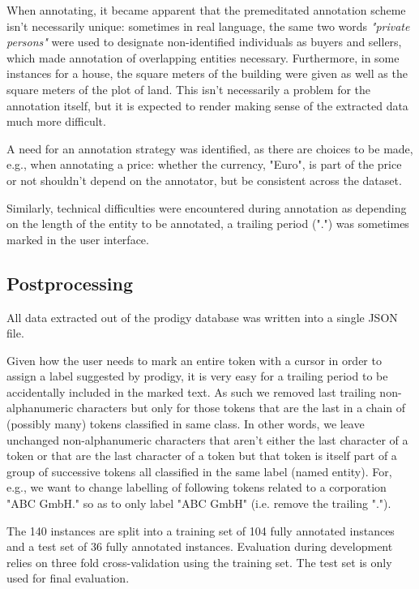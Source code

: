 \documentclass[11pt]{article}
\begin{document}
When annotating, it became apparent that the premeditated annotation scheme isn't necessarily unique: sometimes in real language, the same two words \emph{"private persons"} were used to designate non-identified individuals as buyers and sellers, which made annotation of overlapping entities necessary. Furthermore, in some instances for a house, the square meters of the building were given as well as the square meters of the plot of land. This isn't necessarily a problem for the annotation itself, but it is expected to render making sense of the extracted data much more difficult. 

A need for an annotation strategy was identified, as there are choices to be made, e.g., when annotating a price: whether the currency, "Euro", is part of the price or not shouldn't depend on the annotator, but be consistent across the dataset. 

Similarly, technical difficulties were encountered during annotation as depending on the length of the entity to be annotated, a trailing period (".") was sometimes marked in the user interface. 

\subsection{Postprocessing}

All data extracted out of the prodigy database was written into a single JSON file. 

Given how the user needs to mark an entire token with a cursor in order to assign a label suggested by prodigy, it is very easy for a trailing period to be accidentally included in the marked text. As such we removed last trailing non-alphanumeric characters but only for those tokens that are the last in a chain of (possibly many) tokens classified in same class. In other words, we leave unchanged non-alphanumeric characters that aren't either the last character of a token or that are the last character of a token but that token is itself part of a group of successive tokens all classified in the same label (named entity). For, e.g., we want to change labelling of following tokens related to a corporation "ABC GmbH." so as to only label "ABC GmbH" (i.e. remove the trailing ".").

The 140 instances are split into a training set of 104 fully annotated instances and a test set of 36 fully annotated instances. Evaluation during development relies on three fold cross-validation using the training set. The test set is only used for final evaluation.
\end{document}
